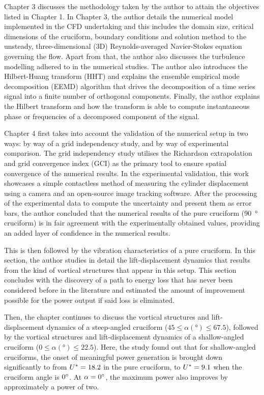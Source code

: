 \documentclass[oneside]{utmthesis}
\begin{document}
Chapter 3 discusses the methodology taken by the author to attain the objectives listed in Chapter 1. In Chapter 3, the author details the numerical model implemented in the CFD undertaking and this includes the domain size, critical dimensions of the cruciform, boundary conditions and solution method to the unsteady, three-dimensional (3D) Reynolds-averaged Navier-Stokes equation governing the flow. Apart from that, the author also discusses the turbulence modelling adhered to in the numerical studies. The author also introduces the Hilbert-Huang transform (HHT) and explains the ensemble empirical mode decomposition (EEMD) algorithm that drives the decomposition of a time series signal into a finite number of orthogonal components. Finally, the author explains the Hilbert transform and how the transform is able to compute instantaneous phase or frequencies of a decomposed component of the signal.

Chapter 4 first takes into account the validation of the numerical setup in two ways: by way of a grid independency study, and by way of experimental comparison. The grid independency study utilises the Richardson extrapolation and grid convergence index (GCI) as the primary tool to ensure spatial convergence of the numerical results. In the experimental validation, this work showcases a simple contactless method of measuring the cylinder displacement using a camera and an open-source image tracking software. After the processing of the experimental data to compute the uncertainty and present them as error bars, the author concluded that the numerical results of the pure cruciform (\SI{90}{\degree} cruciform) is in fair agreement with the experimentally obtained values, providing an added layer of confidence in the numerical results.

This is then followed by the vibration characteristics of a pure cruciform. In this section, the author studies in detail the lift-displacement dynamics that results from the kind of vortical structures that appear in this setup. This section concludes with the discovery of a path to energy loss that has never been considered before in the literature and estimated the amount of improvement possible for the power output if said loss is eliminated.

Then, the chapter continues to discuss the vortical structures and lift-displacement dynamics of a steep-angled cruciform ($45 \le \alpha (\si{\degree}) \le 67.5$), followed by the vortical structures and lift-displacement dynamics of a shallow-angled cruciform ($0 \le \alpha (\si{\degree}) \le 22.5$). Here, the study found out that for shallow-angled cruciforms, the onset of meaningful power generation is brought down significantly to from $U^{*} = 18.2$ in the pure cruciform, to $U^{*} = 9.1$ when the cruciform angle is $\angon$. At $\alpha = \angon$, the maximum power also improves by approximately a power of two.
\end{document}
